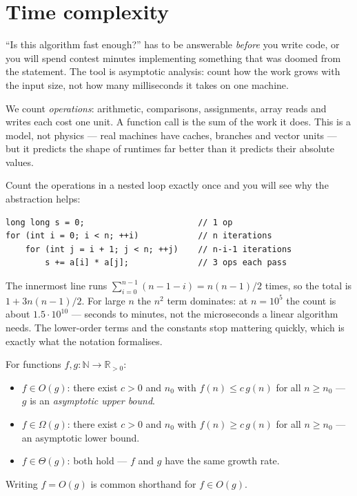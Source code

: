 \section{Time complexity}\label{sec:complexity}

``Is this algorithm fast enough?'' has to be answerable \emph{before} you
write code, or you will spend contest minutes implementing something that was
doomed from the statement. The tool is asymptotic analysis: count how the
work grows with the input size, not how many milliseconds it takes on one
machine.

\begin{definition}
We count \emph{operations}: arithmetic, comparisons, assignments, array
reads and writes each cost one unit. A function call is the sum of the work
it does. This is a model, not physics --- real machines have caches,
branches and vector units --- but it predicts the shape of runtimes far
better than it predicts their absolute values.
\end{definition}

Count the operations in a nested loop exactly once and you will see why the
abstraction helps:

\begin{lstlisting}
long long s = 0;                       // 1 op
for (int i = 0; i < n; ++i)            // n iterations
    for (int j = i + 1; j < n; ++j)    // n-i-1 iterations
        s += a[i] * a[j];              // 3 ops each pass
\end{lstlisting}

The innermost line runs $\sum_{i=0}^{n-1}(n-1-i) = n(n-1)/2$ times, so the
total is $1 + 3n(n-1)/2$. For large $n$ the $n^2$ term dominates: at
$n=10^5$ the count is about $1.5\cdot 10^{10}$ --- seconds to minutes, not
the microseconds a linear algorithm needs. The lower-order terms and the
constants stop mattering quickly, which is exactly what the notation
formalises.

\begin{definition}%
For functions $f,g:\mathbb{N}\to\mathbb{R}_{>0}$:
\begin{itemize}
\item $f \in O(g)$: there exist $c>0$ and $n_0$ with
$f(n) \le c\,g(n)$ for all $n\ge n_0$ --- $g$ is an \emph{asymptotic upper
bound}.
\item $f \in \Omega(g)$: there exist $c>0$ and $n_0$ with
$f(n) \ge c\,g(n)$ for all $n\ge n_0$ --- an asymptotic lower bound.
\item $f \in \Theta(g)$: both hold --- $f$ and $g$ have the same growth rate.
\end{itemize}
Writing $f = O(g)$ is common shorthand for $f \in O(g)$.
\end{definition}

